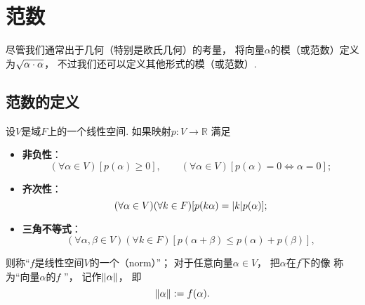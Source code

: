 \section{范数}
尽管我们通常出于几何（特别是欧氏几何）的考量，
将向量\(\alpha\)的模（或范数）定义为\(\sqrt{\alpha\cdot\alpha}\)，
不过我们还可以定义其他形式的模（或范数）.

\subsection{范数的定义}
\begin{definition}
设\(V\)是域\(F\)上的一个线性空间.
如果映射\(p\colon V \to \mathbb{R}\)
满足\begin{itemize}
	\item {\rm\bf 非负性}：\begin{equation*}
		(\forall \alpha \in V)
		[p(\alpha) \geq 0],
		\qquad
		(\forall \alpha \in V)
		[
			p(\alpha) = 0
			\iff
			\alpha = 0
		];
	\end{equation*}

	\item {\rm\bf 齐次性}：\begin{equation*}
		(\forall \alpha \in V)
		(\forall k \in F)
		[
			p(k \alpha) = \abs{k} p(\alpha)
		];
	\end{equation*}

	\item {\rm\bf 三角不等式}：\begin{equation*}
		(\forall \alpha,\beta \in V)
		(\forall k \in F)
		[
			p(\alpha+\beta) \leq p(\alpha) + p(\beta)
		],
	\end{equation*}
\end{itemize}
则称“\(f\)是线性空间\(V\)的一个（norm）”；
对于任意向量\(\alpha \in V\)，
把\(\alpha\)在\(f\)下的像
称为“向量\(\alpha\)的\(f\) ”，
记作\(\norm{\alpha}\)，
即\begin{equation*}
	\norm{\alpha}
	:=
	f(\alpha).
\end{equation*}
\end{definition}

